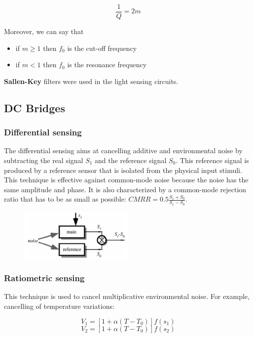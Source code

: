 $$\dfrac{1}{Q} = 2 m$$

Moreover, we can say that
\begin{itemize}
    \item if $m \geq 1$ then $f_0$ is the cut-off frequency
    \item if $m< 1$ then $f_0$ is the resonance frequency
\end{itemize}

\textbf{Sallen-Key} filters were used in the light sensing circuits.

\subsection{DC Bridges}

\subsubsection{Differential sensing}

The differential sensing aims at cancelling additive and environmental noise by subtracting the real signal $S_1$ and the reference signal $S_0$. This reference signal is produced by a reference sensor that is isolated from the physical input
stimuli. This technique is effective against common-mode noise because the noise has the same amplitude and phase. It is also characterized by a common-mode rejection ratio that has to be as small as possible: $CMRR = 0.5\frac{S_1 + S_0}{S_1 - S_0}$.

\begin{figure}[H]
    \centering
    \includegraphics[width = 0.5\textwidth]{L4/img/diff-sensing.PNG}
\end{figure}

\subsubsection{Ratiometric sensing}

This technique is used to cancel multiplicative
environmental noise. For example, cancelling of temperature variations:

$$ V_1 = [1+ \alpha(T - T_0)]f(s_1) $$
$$ V_2 = [1+ \alpha(T - T_0)]f(s_2) $$

